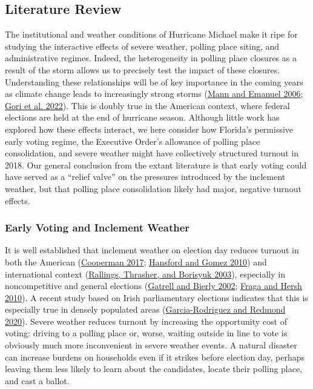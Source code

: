 \documentclass[
  12pt,
]{article}
\begin{document}
\hypertarget{literature-review}{%
\subsection*{Literature Review}\label{literature-review}}

The institutional and weather conditions of Hurricane Michael make it ripe for studying the interactive effects of severe weather, polling place siting, and administrative regimes. Indeed, the heterogeneity in polling place closures as a result of the storm allows us to precisely test the impact of these closures. Understanding these relationships will be of key importance in the coming years as climate change leads to increasingly strong storms (\protect\hyperlink{ref-Mann2006}{Mann and Emanuel 2006}; \protect\hyperlink{ref-Gori2022}{Gori et al. 2022}). This is doubly true in the American context, where federal elections are held at the end of hurricane season. Although little work has explored how these effects interact, we here consider how Florida's permissive early voting regime, the Executive Order's allowance of polling place consolidation, and severe weather might have collectively structured turnout in 2018. Our general conclusion from the extant literature is that early voting could have served as a ``relief valve'' on the pressures introduced by the inclement weather, but that polling place consolidation likely had major, negative turnout effects.

\hypertarget{early-voting-and-inclement-weather}{%
\subsubsection*{Early Voting and Inclement Weather}\label{early-voting-and-inclement-weather}}

It is well established that inclement weather on election day reduces turnout in both the American (\protect\hyperlink{ref-Cooperman2017}{Cooperman 2017}; \protect\hyperlink{ref-Hansford2010}{Hansford and Gomez 2010}) and international context (\protect\hyperlink{ref-Rallings2003}{Rallings, Thrasher, and Borisyuk 2003}), especially in noncompetitive and general elections (\protect\hyperlink{ref-Gatrell2002}{Gatrell and Bierly 2002}; \protect\hyperlink{ref-Fraga2010}{Fraga and Hersh 2010}). A recent study based on Irish parliamentary elections indicates that this is especially true in densely populated areas (\protect\hyperlink{ref-Garcia-Rodriguez2020}{Garcia-Rodriguez and Redmond 2020}). Severe weather reduces turnout by increasing the opportunity cost of voting: driving to a polling place or, worse, waiting outside in line to vote is obviously much more inconvenient in severe weather events. A natural disaster can increase burdens on households even if it strikes before election day, perhaps leaving them less likely to learn about the candidates, locate their polling place, and cast a ballot.
\end{document}
